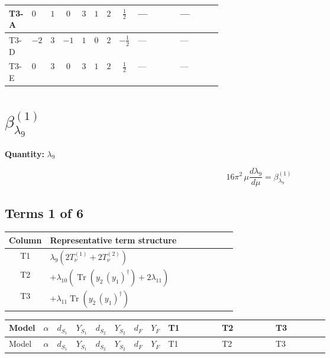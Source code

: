 \documentclass[8pt]{article}
\begin{document}
\begin{landscape}
\begin{longtable}{@{}llcccccc >{\raggedright\arraybackslash}p{0.21\linewidth} >{\raggedright\arraybackslash}p{0.21\linewidth}@{}}
\midrule
T3-A & $0$ & $1$ & $0$ & $3$ & $1$ & $2$ & $\frac{1}{2}$ & --- & --- \\
\midrule
T3-D & $-2$ & $3$ & $-1$ & $1$ & $0$ & $2$ & $-\frac{1}{2}$ & --- & --- \\
\midrule
T3-E & $0$ & $3$ & $0$ & $3$ & $1$ & $2$ & $\frac{1}{2}$ & --- & --- \\
\midrule
\bottomrule
\end{longtable}
\clearpage
\section*{$\beta_{\lambda_{9}}^{(1)}$}
\noindent\textbf{Quantity: }$\lambda_{9}$\par\smallskip
\[16\pi^2\,\mu\frac{d \lambda_{9}}{d\mu}=\beta_{\lambda_{9}}^{(1)}\]
\subsection*{Terms 1 of 6}
\begin{center}
\begin{tabular}{@{}c >{\raggedright\arraybackslash}p{0.82\linewidth}@{}}
\toprule
Column & Representative term structure \\
\midrule
T1 & \(\displaystyle {\lambda_9} (2 T_{\nu}^{(1)}+2 T_{\nu}^{(2)})\) \\
\midrule
T2 & \(\displaystyle +{\lambda_{10}} (\operatorname{Tr}\!\left({y_2}\,\left({y_1}\right)^{\dagger}\right)+2 {\lambda_{11}})\) \\
\midrule
T3 & \(\displaystyle +{\lambda_{11}} \operatorname{Tr}\!\left({y_2}\,\left({y_1}\right)^{\dagger}\right)\) \\
\midrule
\bottomrule
\end{tabular}
\end{center}
\smallskip
\tiny
\begin{longtable}{@{}llcccccc >{\raggedright\arraybackslash}p{0.21\linewidth} >{\raggedright\arraybackslash}p{0.21\linewidth} >{\raggedright\arraybackslash}p{0.21\linewidth}@{}}
\toprule
Model & $\alpha$ & $d_{S_1}$ & $Y_{S_1}$ & $d_{S_2}$ & $Y_{S_2}$ & $d_F$ & $Y_F$ & T1 & T2 & T3 \\
\midrule
\endfirsthead
\toprule
Model & $\alpha$ & $d_{S_1}$ & $Y_{S_1}$ & $d_{S_2}$ & $Y_{S_2}$ & $d_F$ & $Y_F$ & T1 & T2 & T3 \\
\midrule
\endhead

\end{longtable}
\end{landscape}
\end{document}

